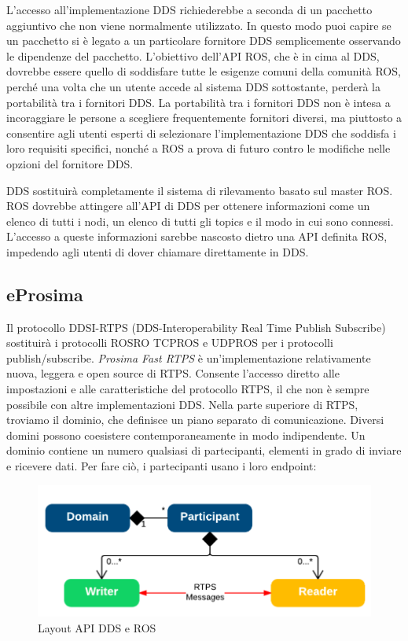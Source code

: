 \documentclass[a4paper]{article}
\begin{document}
L'accesso all'implementazione DDS richiederebbe a seconda di un pacchetto aggiuntivo che non viene normalmente utilizzato. In questo modo puoi capire se un pacchetto si è legato a un particolare fornitore DDS semplicemente osservando le dipendenze del pacchetto. L'obiettivo dell'API ROS, che è in cima al DDS, dovrebbe essere quello di soddisfare tutte le esigenze comuni della comunità ROS, perché una volta che un utente accede al sistema DDS sottostante, perderà la portabilità tra i fornitori DDS. La portabilità tra i fornitori DDS non è intesa a incoraggiare le persone a scegliere frequentemente fornitori diversi, ma piuttosto a consentire agli utenti esperti di selezionare l'implementazione DDS che soddisfa i loro requisiti specifici, nonché a ROS a prova di futuro contro le modifiche nelle opzioni del fornitore DDS.

DDS sostituirà completamente il sistema di rilevamento basato sul master ROS. ROS dovrebbe attingere all'API di DDS per ottenere informazioni come un elenco di tutti i nodi, un elenco di tutti gli topics e il modo in cui sono connessi. L'accesso a queste informazioni sarebbe nascosto dietro una API definita ROS, impedendo agli utenti di dover chiamare direttamente in DDS.

\subsection{eProsima}
Il protocollo DDSI-RTPS (DDS-Interoperability Real Time Publish Subscribe) sostituirà i protocolli ROSRO TCPROS e UDPROS per i protocolli publish/subscribe.
\textit{Prosima Fast RTPS} è un'implementazione relativamente nuova, leggera e open source di RTPS. Consente l'accesso diretto alle impostazioni e alle caratteristiche del protocollo RTPS, il che non è sempre possibile con altre implementazioni DDS. 
Nella parte superiore di RTPS, troviamo il dominio, che definisce un piano separato di comunicazione. Diversi domini possono coesistere contemporaneamente in modo indipendente. Un dominio contiene un numero qualsiasi di partecipanti, elementi in grado di inviare e ricevere dati. Per fare ciò, i partecipanti usano i loro endpoint:

\begin{figure}[htbp]
\centering
\includegraphics[scale=0.5]{dds_img1.PNG} 
\caption{Layout API DDS e ROS}
\end{figure}
\end{document}
